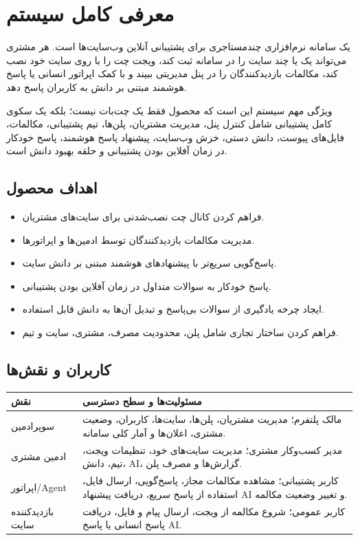 \documentclass[12pt,a4paper]{article}
\newcommand{\en}[1]{\lr{#1}}
\newcommand{\code}[1]{\lr{\texttt{#1}}}
\begin{document}
\section{معرفی کامل سیستم}
\en{AI Chat SaaS} یک سامانه نرم‌افزاری چندمستاجری برای پشتیبانی آنلاین وب‌سایت‌ها است. هر مشتری می‌تواند یک یا چند سایت را در سامانه ثبت کند، ویجت چت را با \code{site\_key} روی سایت خود نصب کند، مکالمات بازدیدکنندگان را در پنل مدیریتی ببیند و با کمک اپراتور انسانی یا پاسخ هوشمند مبتنی بر دانش به کاربران پاسخ دهد.

ویژگی مهم سیستم این است که محصول فقط یک چت‌بات نیست؛ بلکه یک سکوی کامل پشتیبانی شامل کنترل پنل، مدیریت مشتریان، پلن‌ها، تیم پشتیبانی، مکالمات، فایل‌های پیوست، دانش دستی، خزش وب‌سایت، پیشنهاد پاسخ هوشمند، پاسخ خودکار در زمان آفلاین بودن پشتیبانی و حلقه بهبود دانش است.

\subsection{اهداف محصول}
\begin{itemize}
  \item فراهم کردن کانال چت نصب‌شدنی برای سایت‌های مشتریان.
  \item مدیریت مکالمات بازدیدکنندگان توسط ادمین‌ها و اپراتورها.
  \item پاسخ‌گویی سریع‌تر با پیشنهادهای هوشمند مبتنی بر دانش سایت.
  \item پاسخ خودکار به سوالات متداول در زمان آفلاین بودن پشتیبانی.
  \item ایجاد چرخه یادگیری از سوالات بی‌پاسخ و تبدیل آن‌ها به دانش قابل استفاده.
  \item فراهم کردن ساختار تجاری \en{SaaS} شامل پلن، محدودیت مصرف، مشتری، سایت و تیم.
\end{itemize}

\subsection{کاربران و نقش‌ها}
\begin{longtable}{>{\raggedleft\arraybackslash}p{3.5cm} p{11cm}}
\toprule
\textbf{نقش} & \textbf{مسئولیت‌ها و سطح دسترسی} \\
\midrule
سوپرادمین & مالک پلتفرم؛ مدیریت مشتریان، پلن‌ها، سایت‌ها، کاربران، وضعیت مشتری، اعلان‌ها و آمار کلی سامانه. \\
ادمین مشتری & مدیر کسب‌وکار مشتری؛ مدیریت سایت‌های خود، تنظیمات ویجت، تیم، دانش، AI، گزارش‌ها و مصرف پلن. \\
اپراتور/Agent & کاربر پشتیبانی؛ مشاهده مکالمات مجاز، پاسخ‌گویی، ارسال فایل، استفاده از پاسخ سریع، دریافت پیشنهاد AI و تغییر وضعیت مکالمه. \\
بازدیدکننده سایت & کاربر عمومی؛ شروع مکالمه از ویجت، ارسال پیام و فایل، دریافت پاسخ انسانی یا پاسخ AI. \\
\bottomrule
\end{longtable}
\end{document}
